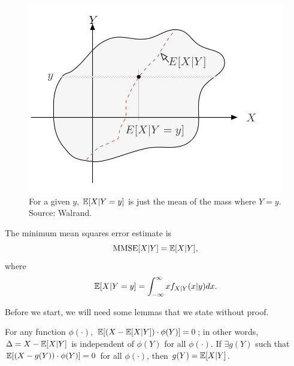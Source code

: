 \documentclass[11 pt]{scrartcl}
\begin{document}
\begin{figure}[!htb]
    \centering
    \includegraphics[scale=0.6]{MMSE.png}
    \caption{For a given $y$, $\mathbb E[X|Y=y]$ is just the mean of the mass where $Y=y$. Source: Walrand.}
\end{figure}

\begin{theorem}[Walrand 7.4]
    The minimum mean squares error estimate is 
    \[ \text{MMSE}[X|Y] = \mathbb E[X|Y],\] 
    where 
    \[ \mathbb E[X|Y = y] = \int_{-\infty}^\infty x f_{X|Y}(x|y) dx.\] 
\end{theorem}

Before we start, we will need some lemmas that we state without proof. 

\begin{lemma}[Walrand 7.6]
    For any function $\phi(\cdot)$, 
    \alphanum
        \ii $\mathbb E[(X - \mathbb E[X|Y])\cdot \phi(Y)] = 0$; in other words, $\Delta = X - \mathbb E[X|Y]$ is independent of $\phi(Y)$ for all $\phi(\cdot)$.  
        \ii If $\exists g(Y)$ such that $\mathbb E[(X - g(Y))\cdot \phi(Y)] = 0$ for all $\phi(\cdot)$, then $g(Y) = \mathbb E[X | Y]$. 
    \enumend
\end{lemma}
\end{document}

